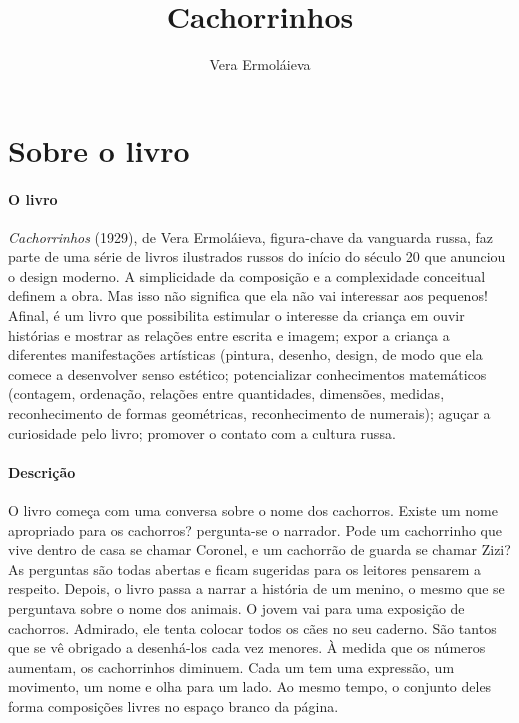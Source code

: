 \documentclass[11pt]{extarticle}
\newcommand{\AutorLivro}{Vera Ermoláieva}
\newcommand{\TituloLivro}{Cachorrinhos}
\newcommand{\colaborador}{{Paulo Pompermaier e Renier Silva}}
\begin{document}
\title{\TituloLivro}
\author{\AutorLivro}
\def\authornotes{\colaborador}

\date{}
\maketitle


\tableofcontents



\section{Sobre o livro}

\paragraph{O livro} \textit{Cachorrinhos} (1929), de Vera Ermoláieva, figura-chave da vanguarda russa, faz parte de uma série de livros ilustrados russos do início do século 20 que anunciou o design moderno.
A simplicidade da composição e a complexidade conceitual definem a obra. Mas isso não
significa que ela não vai interessar aos pequenos! Afinal, é um livro que possibilita
estimular o interesse da criança em ouvir histórias e mostrar as relações entre
escrita e imagem; expor a criança a diferentes manifestações artísticas (pintura, desenho, design, de modo que ela comece a desenvolver senso estético; potencializar conhecimentos matemáticos (contagem, ordenação, relações entre quantidades, dimensões, medidas, reconhecimento de formas geométricas, reconhecimento de numerais); aguçar a curiosidade pelo livro; promover o contato com a cultura russa.


\paragraph{Descrição} O livro começa com uma conversa sobre o nome dos cachorros. Existe um nome apropriado para os cachorros? pergunta-se o narrador. Pode um cachorrinho que vive dentro de casa se chamar Coronel, e um cachorrão de guarda se chamar Zizi? As perguntas são todas abertas e ficam sugeridas para os leitores pensarem a respeito. Depois, o livro passa a narrar a história de um menino, o mesmo que se perguntava sobre o nome dos animais.
O jovem vai para uma exposição de cachorros. Admirado, ele tenta colocar todos os cães no
seu caderno. São tantos que se vê obrigado a desenhá-los cada vez menores. À medida que os
números aumentam, os cachorrinhos diminuem. Cada um tem uma expressão, um
movimento, um nome e olha para um lado. Ao mesmo tempo, o conjunto deles forma
composições livres no espaço branco da página.
\end{document}
